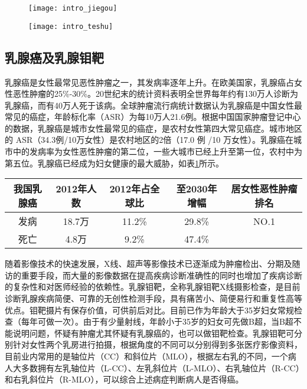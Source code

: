 \begin{figure}[!htbp]
    \centering
    \texttt{[image: intro\_jiegou]}
    \label{fig:intro_jiegou}
\end{figure}

\begin{figure}[!htbp]
    \centering
    \texttt{[image: intro\_teshu]}
    \label{fig:intro_teshu}
\end{figure}

\subsection{乳腺癌及乳腺钼靶}
乳腺癌是女性最常见恶性肿瘤之一，其发病率逐年上升。在欧美国家，乳腺癌占女性恶性肿瘤的25\%-30\%。20世纪末的统计资料表明全世界每年约有130万人诊断为乳腺癌，而有40万人死于该病。全球肿瘤流行病统计数据认为乳腺癌是中国女性最常见的癌症，年龄标化率（ASR）为每10万人21.6例。根据中国国家肿瘤登记中心的数据，乳腺癌是城市女性最常见的癌症，是农村女性第四大常见癌症。城市地区的 ASR（34.3例/10万女性）是农村地区的2倍（17.0 例 /10 万女性）\cite{1li2012analysis}。乳腺癌在城市中的发病率为女性恶性肿瘤的第二位，一些大城市已经上升至第一位，农村中为第五位。乳腺癌已经成为妇女健康的最大威胁，如表\ref{tab:basic_info_mam}所示。
\begin{table}[!htbp]
    \label{tab:basic_info_mam}
    \centering
    \footnotesize%
    \setlength{\tabcolsep}{4pt}%
    \renewcommand{\arraystretch}{1.2}%
    \begin{tabular}{ccccc}
        \hline
        我国乳腺癌& 2012年人数& 2012年占全球比& 至2030年增幅& 居女性恶性肿瘤排名\\
        \hline
        发病& 18.7万& 11.2\%& 29.8\%& NO.1\\
		死亡& 4.8万& 9.2\%& 47.4\%& \\
        \hline
    \end{tabular}
\end{table}

随着影像技术的快速发展，X线、超声等影像技术已逐渐成为肿瘤检出、分期及随访的重要手段，而大量的影像数据在提高疾病诊断准确性的同时也增加了疾病诊断的复杂性和对医师经验的依赖性。乳腺钼靶，全称乳腺钼靶X线摄影检查，是目前诊断乳腺疾病简便、可靠的无创性检测手段，具有痛苦小、简便易行和重复性高等优点。钼靶摄片有保存价值，可供前后对比。目前已作为年龄大于35岁妇女常规检查（每年可做一次）\cite{2冀焕梅2003乳腺良恶性肿瘤的钼靶}。由于有少量射线，年龄小于35岁的妇女可先做B超，当B超不能说明问题，怀疑有肿瘤尤其怀疑有乳腺癌的，也可以做钼靶检查。乳腺钼靶可分别针对女性两个乳房进行拍摄，根据角度的不同可以分别得到多张医疗影像资料，目前业内常用的是轴位片（CC）和斜位片（MLO），根据左右乳的不同，一个病人大多数拥有左乳轴位片（L-CC）、左乳斜位片（L-MLO）、右乳轴位片（R-CC）和右乳斜位片（R-MLO），可以综合上述病症判断病人是否得癌。

